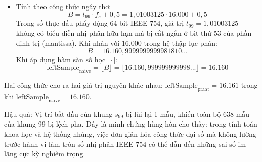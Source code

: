 \begin{enumerate}[label=(\alph*)]
\begin{itemize}
        \item Tính theo công thức ngây thơ:
        \begin{equation}
            B = t_{99} \cdot f_s + 0{,}5 = 1{,}01003125 \cdot 16.000 + 0{,}5
        \end{equation}
        Trong số thực dấu phẩy động 64-bit IEEE-754, giá trị $t_{99} = 1{,}01003125$ không có biểu diễn nhị phân hữu hạn mà bị cắt ngắn ở bit thứ 53 của phần định trị (mantissa). Khi nhân với $16.000$ trong hệ thập lục phân:
        \begin{equation}
            B = 16.160{,}9999999999981810...
        \end{equation}
        Khi áp dụng hàm sàn số học $\lfloor \cdot \rfloor$:
        \begin{equation}
            \text{leftSample}_{\text{naive}} = \lfloor B \rfloor = \lfloor 16.160{,}999999999998... \rfloor = 16.160
        \end{equation}
    \end{itemize}
    Hai công thức cho ra hai giá trị nguyên khác nhau: $\text{leftSample}_{\text{praat}} = 16.161$ trong khi $\text{leftSample}_{\text{naive}} = 16.160$. 
    
    Hậu quả: Vị trí bắt đầu của khung $s_{99}$ bị lùi lại 1 mẫu, khiến toàn bộ 638 mẫu của khung 99 bị lệch pha. Đây là minh chứng hùng hồn cho thấy: trong tính toán khoa học và hệ thống nhúng, việc đơn giản hóa công thức đại số mà không lường trước hành vi làm tròn số nhị phân IEEE-754 có thể dẫn đến những sai số im lặng cực kỳ nghiêm trọng.
\end{enumerate}




